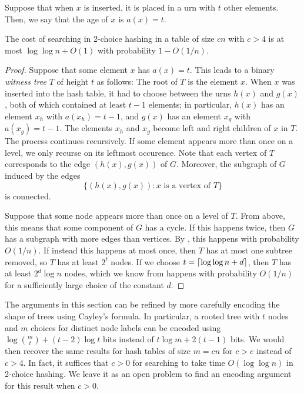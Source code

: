 \documentclass{patmorin}
\begin{document}
Suppose that when $x$ is inserted, it is placed in a urn with $t$
other elements. Then, we say that the age of $x$ is $a(x) = t$.
\begin{thm}
  The cost of searching in 2-choice hashing in a table of size $cn$
  with $c > 4$ is at most $\log \log n + O(1)$ with probability $1 -
  O(1/n)$.
\end{thm}
\begin{proof}
  Suppose that some element $x$ has $a(x) = t$. This leads to a binary
  \emph{witness tree} $T$ of height $t$ as follows: The root of $T$ is
  the element $x$. When $x$ was inserted into the hash table, it had
  to choose between the urns $h(x)$ and $g(x)$, both of which
  contained at least $t - 1$ elements; in particular, $h(x)$ has an
  element $x_h$ with $a(x_h) = t - 1$, and $g(x)$ has an element $x_g$
  with $a(x_g) = t - 1$. The elements $x_h$ and $x_g$ become left and
  right children of $x$ in $T$. The process continues recursively. If
  some element appears more than once on a level, we only recurse on
  its leftmost occurence. Note that each vertex of $T$ corresponds to
  the edge $(h(x), g(x))$ of $G$. Moreover, the subgraph of $G$
  induced by the edges
  \[
    \{(h(x), g(x)) : x \text{ is a vertex of } T\}
  \]
  is connected.

  Suppose that some node appears more than once on a level of
  $T$. From above, this means that some component of $G$ has a
  cycle. If this happens twice, then $G$ has a subgraph with more
  edges than vertices. By , this happens
  with probability $O(1/n)$. If instead this happens at most once,
  then $T$ has at most one subtree removed, so $T$ has at least $2^t$
  nodes. If we choose $t = {\lceil \log \log n + d \rceil}$, then $T$ has at
  least $2^d \log n$ nodes, which we know from
   happens with probability $O(1/n)$
  for a sufficiently large choice of the constant $d$.
\end{proof}

\begin{rem}
  The arguments in this section can be refined by more carefully
  encoding the shape of trees using Cayley's formula. In particular, a
  rooted tree with $t$ nodes and $m$ choices for distinct node labels
  can be encoded using $\log \binom{m}{t} + (t - 2) \log t$ bits
  instead of $t \log m + 2(t - 1)$ bits. We would then recover the
  same results for hash tables of size $m = cn$ for $c > e$ instead of
  $c > 4$. In fact, it suffices that $c > 0$ for searching to take
  time $O(\log \log n)$ in 2-choice hashing. We leave it as an open
  problem to find an encoding argument for this result when $c > 0$.
\end{rem}
\end{document}
